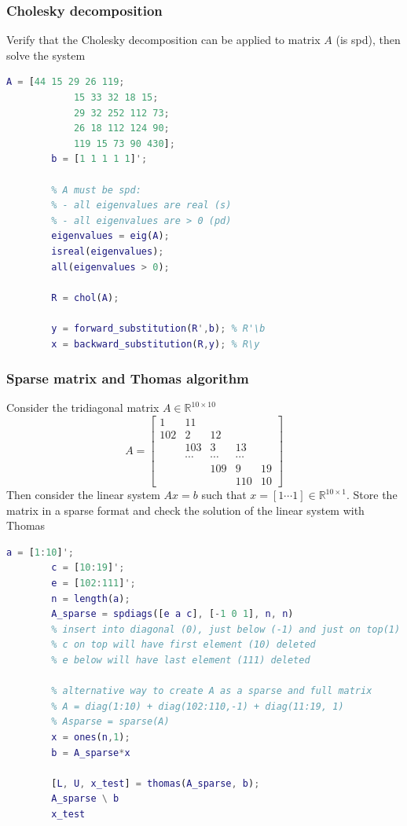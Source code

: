     \subsubsection{Cholesky decomposition}
        Verify that the Cholesky decomposition can be applied to matrix $A$ (is spd), then solve the system

        \begin{lstlisting}[language=Matlab, escapeinside=`', gobble=8]
        A = [44 15 29 26 119;
            15 33 32 18 15;
            29 32 252 112 73;
            26 18 112 124 90;
            119 15 73 90 430];
        b = [1 1 1 1 1]';
       
        % A must be spd:
        % - all eigenvalues are real (s)
        % - all eigenvalues are > 0 (pd)
        eigenvalues = eig(A);
        isreal(eigenvalues);
        all(eigenvalues > 0);
        
        R = chol(A);
        
        y = forward_substitution(R',b); % R'\b
        x = backward_substitution(R,y); % R\y
        \end{lstlisting}
    
    \subsubsection{Sparse matrix and Thomas algorithm}
        Consider the tridiagonal matrix $A\in\mathbb{R}^{10\times 10}$
        $$
        A=\begin{bmatrix}
            1 & 11\\
            102 & 2 & 12\\
            & 103 & 3 & 13\\
            & \cdots & \cdots & \cdots\\
            &  & 109 & 9 & 19\\
            &  &  & 110 & 10
        \end{bmatrix}
        $$
        Then consider the linear system $Ax=b$ such that $x=[1\cdots 1]\in\mathbb{R}^{10\times 1}$. Store the matrix in a sparse format and check the solution of the linear system with Thomas
        \begin{lstlisting}[language=Matlab, escapeinside=`', gobble=8]
        a = [1:10]';
        c = [10:19]';
        e = [102:111]';
        n = length(a);
        A_sparse = spdiags([e a c], [-1 0 1], n, n)
        % insert into diagonal (0), just below (-1) and just on top(1)
        % c on top will have first element (10) deleted
        % e below will have last element (111) deleted

        % alternative way to create A as a sparse and full matrix
        % A = diag(1:10) + diag(102:110,-1) + diag(11:19, 1)
        % Asparse = sparse(A)
        x = ones(n,1);
        b = A_sparse*x

        [L, U, x_test] = thomas(A_sparse, b);
        A_sparse \ b
        x_test
        \end{lstlisting}

